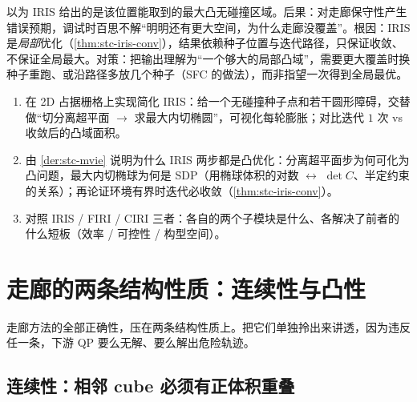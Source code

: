 \begin{pitfall}
以为 IRIS 给出的是该位置能取到的最大凸无碰撞区域。后果：对走廊保守性产生错误预期，调试时百思不解“明明还有更大空间，为什么走廊没覆盖”。根因：IRIS 是\emph{局部}优化（\cref{thm:stc-iris-conv}），结果依赖种子位置与迭代路径，只保证收敛、不保证全局最大。对策：把输出理解为“一个够大的局部凸域”，需要更大覆盖时换种子重跑、或沿路径多放几个种子（SFC 的做法），而非指望一次得到全局最优。
\end{pitfall}

\begin{practice}
\begin{enumerate}
  \item 在 2D 占据栅格上实现简化 IRIS：给一个无碰撞种子点和若干圆形障碍，交替做“切分离超平面 $\to$ 求最大内切椭圆”，可视化每轮膨胀；对比迭代 $1$ 次 vs 收敛后的凸域面积。
  \item 由 \cref{der:stc-mvie} 说明为什么 IRIS 两步都是凸优化：分离超平面步为何可化为凸问题，最大内切椭球为何是 SDP（用椭球体积的对数 $\leftrightarrow$ $\det C$、半定约束的关系）；再论证环境有界时迭代必收敛（\cref{thm:stc-iris-conv}）。
  \item 对照 IRIS / FIRI / CIRI 三者：各自的两个子模块是什么、各解决了前者的什么短板（效率 / 可控性 / 构型空间）。
\end{enumerate}
\end{practice}

\section{走廊的两条结构性质：连续性与凸性}
\label{sec:stc-continuity}

走廊方法的全部正确性，压在两条结构性质上。把它们单独拎出来讲透，因为违反任一条，下游 QP 要么无解、要么解出危险轨迹。

\subsection{连续性：相邻 cube 必须有正体积重叠}
\label{sec:stc-overlap}

